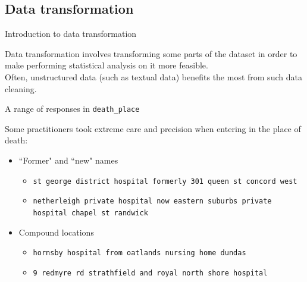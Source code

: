 \documentclass[]{beamer}
\begin{document}
	\subsection{Data transformation}

\begin{frame}{Introduction to data transformation}
	
	Data transformation involves transforming some parts of the dataset in order to make performing statistical analysis on it more feasible.\\
	\vspace{1em}	
	Often, unstructured data (such as textual data) benefits the most from such data cleaning.
\end{frame}

	

\begin{frame}[fragile]{A range of responses in \texttt{death\_place}}

	Some practitioners took extreme care and precision when entering in the place of death:
	\begin{itemize}
		\item \small ``Former" and ``new" names
		\begin{itemize}
			\item \texttt{st george district hospital \alert{formerly} 301 queen st concord west}
			\item \texttt{netherleigh private hospital \alert{now} eastern suburbs private hospital chapel st randwick}
		\end{itemize}

		\item \small Compound locations
		\begin{itemize}
			\item \texttt{hornsby hospital \alert{from} oatlands nursing home dundas}
			\item \texttt{9 redmyre rd strathfield \alert{and} royal north shore hospital}
		\end{itemize}
	\end{itemize}

\end{frame}
\end{document}
